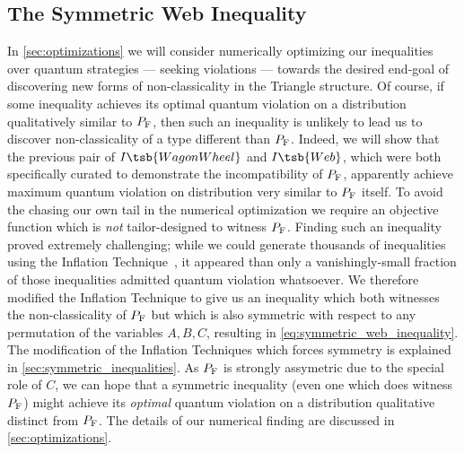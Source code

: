 \documentclass[aps, 10pt, english, twoside, pra, nofootinbib, tightenlines, longbibliography, superscriptaddress]{revtex4-1}
\begin{document}
    \subsection{The Symmetric Web Inequality}
    In \cref{sec:optimizations} we will consider numerically optimizing our inequalities over quantum strategies --- seeking violations --- towards the desired end-goal of discovering new forms of non-classicality in the Triangle structure. Of course, if some inequality achieves its optimal quantum violation on a distribution qualitatively similar to $\prob[\fritz]$, then such an inequality is unlikely to lead us to discover non-classicality of a type different than $\prob[\fritz]$. Indeed, we will show that the previous pair of $I\tsb{WagonWheel}$ and $I\tsb{Web}$, which were both specifically curated to demonstrate the incompatibility of $\prob[\fritz]$, apparently achieve maximum quantum violation on distribution very similar to $\prob[\fritz]$ itself.
    To avoid the chasing our own tail in the numerical optimization we require an objective function which is \emph{not} tailor-designed to witness $\prob[\fritz]$. Finding such an inequality proved extremely challenging; while we could generate thousands of inequalities using the Inflation Technique~\cite{Inflation}, it appeared than only a vanishingly-small fraction of those inequalities admitted quantum violation whatsoever. We therefore modified the Inflation Technique to give us an inequality which both witnesses the non-classicality of $\prob[\fritz]$ but which is also symmetric with respect to any permutation of the variables $A, B, C$, resulting in \cref{eq:symmetric_web_inequality}. The modification of the Inflation Techniques which forces symmetry is explained in \cref{sec:symmetric_inequalities}. As $\prob[\fritz]$ is strongly assymetric due to the special role of $C$, we can hope that a symmetric inequality (even one which does witness $\prob[\fritz]$) might achieve its \emph{optimal} quantum violation on a distribution qualitative distinct from $\prob[\fritz]$. The details of our numerical finding are discussed in \cref{sec:optimizations}.


\end{document}
